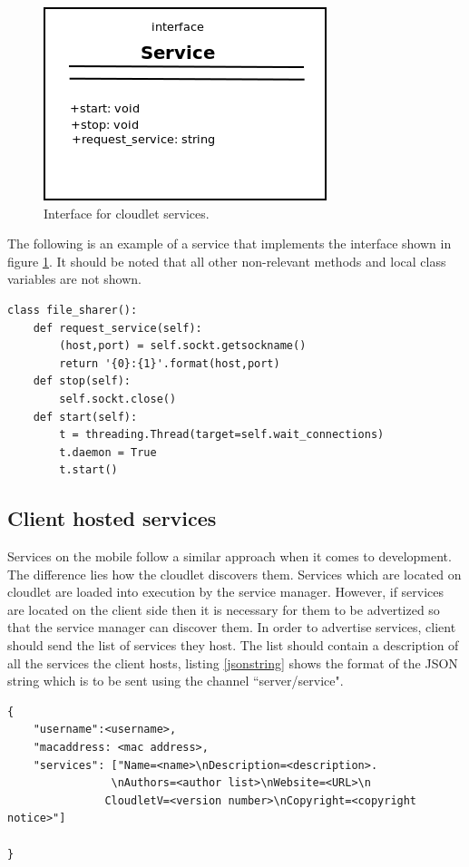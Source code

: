 \begin{figure}[!h]
\centering
\includegraphics{figures/serviceinterface}
\caption{Interface for cloudlet services.}
\label{fig:serviceinterface}
\end{figure}

The following is an example of a service that implements the interface shown in
figure \ref{fig:serviceinterface}. It should be noted that all other non-relevant methods and local class variables are not shown.

\begin{lstlisting}[caption=File Sharing service which implements the service interface.]
class file_sharer():
	def request_service(self):
		(host,port) = self.sockt.getsockname()
		return '{0}:{1}'.format(host,port)
	def stop(self):
		self.sockt.close()
	def start(self):
		t = threading.Thread(target=self.wait_connections)
		t.daemon = True
		t.start()
\end{lstlisting}

\subsection{Client hosted services}
Services on the mobile follow a similar approach when it comes to development. The difference lies how the cloudlet discovers them. Services which are located on cloudlet are loaded into execution by the service manager. However, if services are located on the client side then it is necessary for them to be advertized so that the service manager can discover them. In order to advertise services, client should send the list of services they host. The list should contain a description of all the services the client hosts, listing \ref{jsonstring} shows the format of the JSON string which is to be sent using the channel ``server/service".

\begin{lstlisting}[caption=JSON string which is to be sent from client to cloudlet to advertize client hosted services., label=jsonstring]
{
	"username":<username>,
	"macaddress: <mac address>,
	"services": ["Name=<name>\nDescription=<description>.
	            \nAuthors=<author list>\nWebsite=<URL>\n
	           CloudletV=<version number>\nCopyright=<copyright notice>"]

}
\end{lstlisting}




